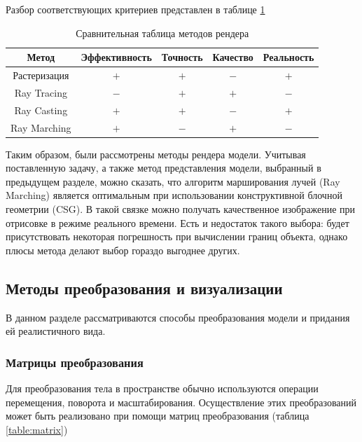Разбор соответствующих критериев представлен в таблице \ref{table:presentation}

\begin{table}[h]
	\begin{center}
		\captionsetup{justification=centering}
		\begin{tabular}{| c | c | c | c | c |}
			\hline
			Метод & Эффективность & Точность & Качество & Реальность \\
			\hline
			Растеризация &$+$ & $+$ & $-$ & $+$\\
			\hline
			Ray Tracing & $-$ & $+$ & $+$ & $-$\\
			\hline
			Ray Casting  & $+$ & $+$ & $-$ & $+$\\
			\hline
			Ray Marching & $+$ & $-$ & $+$ & $-$\\
			\hline
		\end{tabular}
		\caption{Сравнительная таблица методов рендера}
		\label{table:presentation}
	\end{center}
\end{table}

Таким образом, были рассмотрены методы рендера модели.
Учитывая поставленную задачу, а также метод представления модели, выбранный в предыдущем разделе, можно сказать, что алгоритм марширования лучей (Ray Marching) является оптимальным при использовании конструктивной 
блочной геометрии (CSG). 
В такой связке можно получать качественное 
изображение при отрисовке в режиме реального времени.
Есть и недостаток такого выбора: будет присутствовать некоторая погрешность при вычислении границ объекта, однако плюсы метода делают выбор гораздо выгоднее других.

\subsection{Методы преобразования и визуализации}

В данном разделе рассматриваются способы преобразования модели и 
придания ей реалистичного вида.
\clearpage

\subsubsection{Матрицы преобразования}

Для преобразования тела в пространстве обычно используются операции 
перемещения, поворота и масштабирования.
Осуществление этих преобразований может быть реализовано при помощи матриц преобразования \cite{transformations} (таблица \ref{table:matrix})

